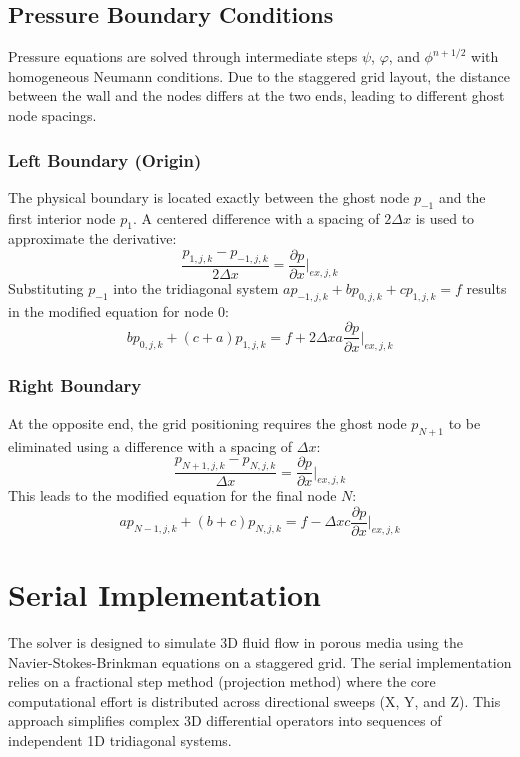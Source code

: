 \documentclass[12pt]{article}
\begin{document}
\subsection{Pressure Boundary Conditions}

Pressure equations are solved through intermediate steps $\psi$, $\varphi$, and $\phi^{n+1/2}$ with homogeneous Neumann conditions. Due to the staggered grid layout, the distance between the wall and the nodes differs at the two ends, leading to different ghost node spacings.

\subsubsection{Left Boundary (Origin)}
The physical boundary is located exactly between the ghost node $p_{-1}$ and the first interior node $p_1$. A centered difference with a spacing of $2\Delta x$ is used to approximate the derivative:
\begin{equation}
    \frac{p_{1,j,k} - p_{-1,j,k}}{2\Delta x} = \frac{\partial p}{\partial x}\Big|_{ex,j,k}
\end{equation}
Substituting $p_{-1}$ into the tridiagonal system $ap_{-1,j,k} + bp_{0,j,k} + cp_{1,j,k} = f$ results in the modified equation for node 0:
\begin{equation}
    bp_{0,j,k} + (c + a)p_{1,j,k} = f + 2\Delta x a \frac{\partial p}{\partial x}\Big|_{ex,j,k}
\end{equation}

\subsubsection{Right Boundary}
At the opposite end, the grid positioning requires the ghost node $p_{N+1}$ to be eliminated using a difference with a spacing of $\Delta x$:
\begin{equation}
    \frac{p_{N+1,j,k} - p_{N,j,k}}{\Delta x} = \frac{\partial p}{\partial x}\Big|_{ex,j,k}
\end{equation}
This leads to the modified equation for the final node $N$:
\begin{equation}
    ap_{N-1,j,k} + (b + c)p_{N,j,k} = f - \Delta x c \frac{\partial p}{\partial x}\Big|_{ex,j,k}
\end{equation}

\section{Serial Implementation}
The solver is designed to simulate 3D fluid flow in porous media using the Navier-Stokes-Brinkman equations on a staggered grid. The serial implementation relies on a fractional step method (projection method) where the core computational effort is distributed across directional sweeps (X, Y, and Z). This approach simplifies complex 3D differential operators into sequences of independent 1D tridiagonal systems.
\end{document}
